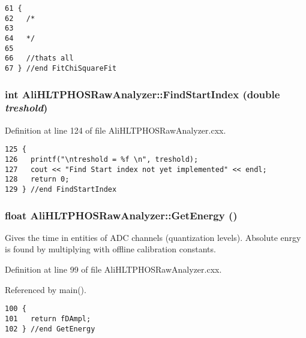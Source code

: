\footnotesize\begin{verbatim}61 {
62   /*
63 
64   */
65 
66   //thats all 
67 } //end FitChiSquareFit
\end{verbatim}\normalsize 


\subsubsection{\setlength{\rightskip}{0pt plus 5cm}int Ali\-HLTPHOSRaw\-Analyzer::Find\-Start\-Index (double {\em treshold})\hspace{0.3cm}{\tt  [inherited]}}\label{classAliHLTPHOSRawAnalyzer_AliHLTPHOSRawAnalyzerPeakFindera9}




Definition at line 124 of file Ali\-HLTPHOSRaw\-Analyzer.cxx.

\footnotesize\begin{verbatim}125 {
126   printf("\ntreshold = %f \n", treshold);
127   cout << "Find Start index not yet implemented" << endl;
128   return 0;
129 } //end FindStartIndex
\end{verbatim}\normalsize 


\subsubsection{\setlength{\rightskip}{0pt plus 5cm}float Ali\-HLTPHOSRaw\-Analyzer::Get\-Energy ()\hspace{0.3cm}{\tt  [inherited]}}\label{classAliHLTPHOSRawAnalyzer_AliHLTPHOSRawAnalyzerPeakFindera11}


Gives the time in entities of ADC channels (quantization levels). Absolute enrgy is found by multiplying with offline calibration constants. 

Definition at line 99 of file Ali\-HLTPHOSRaw\-Analyzer.cxx.

Referenced by main().

\footnotesize\begin{verbatim}100 {
101   return fDAmpl;
102 } //end GetEnergy
\end{verbatim}\normalsize 


